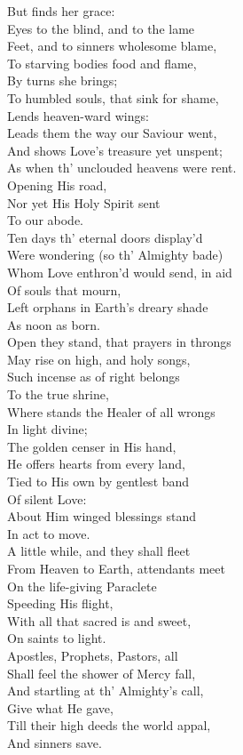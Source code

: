  But finds her grace: \\
  Eyes to the blind, and to the lame \\
 Feet, and to sinners wholesome blame, \\
 To starving bodies food and flame, \\
 By turns she brings; \\
 To humbled souls, that sink for shame, \\
 Lends heaven-ward wings: \\
  Leads them the way our Saviour went, \\
 And shows Love’s treasure yet unspent; \\
 As when th’ unclouded heavens were rent. \\
 Opening His road, \\
 Nor yet His Holy Spirit sent \\
 To our abode. \\
  Ten days th’ eternal doors display’d \\
 Were wondering (so th’ Almighty bade) \\
 Whom Love enthron’d would send, in aid \\
 Of souls that mourn, \\
 Left orphans in Earth’s dreary shade \\
 As noon as born. \\
  Open they stand, that prayers in throngs \\
 May rise on high, and holy songs, \\
 Such incense as of right belongs \\
 To the true shrine, \\
 Where stands the Healer of all wrongs \\
 In light divine; \\
  The golden censer in His hand, \\
 He offers hearts from every land, \\
 Tied to His own by gentlest band \\
 Of silent Love: \\
 About Him winged blessings stand \\
 In act to move. \\
  A little while, and they shall fleet \\
 From Heaven to Earth, attendants meet \\
 On the life-giving Paraclete \\
 Speeding His flight, \\
 With all that sacred is and sweet, \\
 On saints to light. \\
  Apostles, Prophets, Pastors, all \\
 Shall feel the shower of Mercy fall, \\
 And startling at th’ Almighty’s call, \\
 Give what He gave, \\
 Till their high deeds the world appal, \\
 And sinners save.\\

